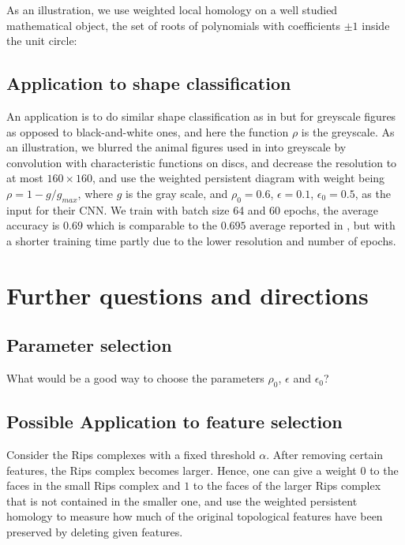 \documentclass[11pt]{article}
\theoremstyle{plain}
\theoremstyle{definition}
\theoremstyle{definition}
\theoremstyle{definition}
\theoremstyle{definition}
\theoremstyle{definition}
\theoremstyle{definition}
\theoremstyle{definition}
\theoremstyle{definition}
\begin{document}
As an illustration, we use weighted local homology on a well studied mathematical object, the set of roots of polynomials with coefficients $\pm 1$ inside the unit circle:

\subsection{Application to shape classification}

An application is to do similar shape classification as in \cite{H} but for greyscale figures as opposed to black-and-white ones, and here the function $\rho$ is the greyscale. As an illustration, we blurred the animal figures used in \cite{H} into greyscale by convolution with characteristic functions on discs, and decrease the resolution to at most $160\times 160$, and use the weighted persistent diagram with weight being $\rho=1-g/g_{max}$, where $g$ is the gray scale, and $\rho_0=0.6$, $\epsilon=0.1$, $\epsilon_0=0.5$, as the input for their CNN. We train with batch size 64 and 60 epochs, the average accuracy is $0.69$ which is comparable to the $0.695$ average reported in \cite{H}, but with a shorter training time partly due to the lower resolution and number of epochs.

\section{Further questions and directions}

\subsection{Parameter selection}

What would be a good way to choose the parameters $\rho_0$, $\epsilon$ and $\epsilon_0$?

\subsection{Possible Application to feature selection}

Consider the Rips complexes with a fixed threshold $\alpha$. After removing certain features, the Rips complex becomes larger. Hence, one can give a weight $0$ to the faces in the small Rips complex and $1$ to the faces of the larger Rips complex that is not contained in the smaller one, and use the weighted persistent homology to measure how much of the original topological features have been preserved by deleting given features.
\end{document}

